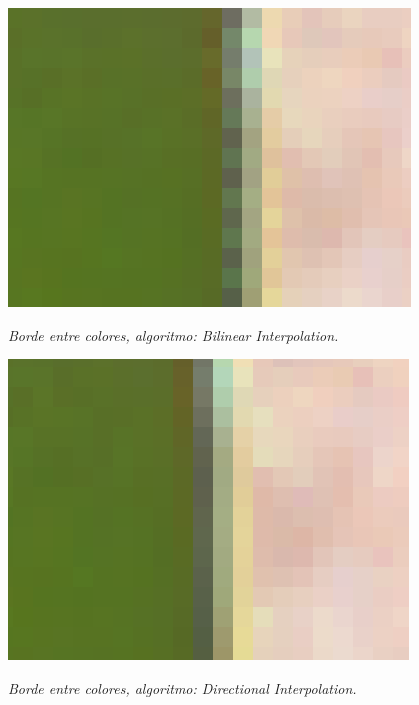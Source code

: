 	\begin{center}
		\includegraphics[scale=.5]{../enunciado/images_files/cualitativo/pico_loro_bilinear.png}
		\vspace{2pt}
		\par
		\footnotesize\textit{Borde entre colores, algoritmo: Bilinear Interpolation.}
	\end{center}

	\begin{center}
		\includegraphics[scale=.5]{../enunciado/images_files/cualitativo/pico_loro_directional.png}
		\vspace{2pt}
		\par
		\footnotesize\textit{Borde entre colores, algoritmo: Directional Interpolation.}
	\end{center}


